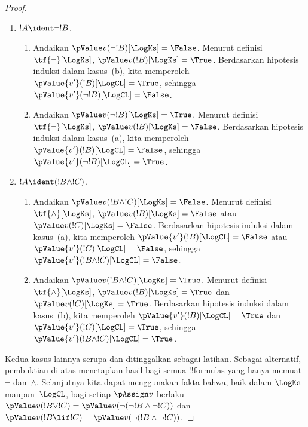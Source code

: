 \documentclass[../../../include/open-logic-section]{subfiles}
\begin{document}
\begin{proof}
\begin{enumerate}
    Untuk langkah induksi, bahas kasus-kasus berikut:
    \item $!A\ident\lnot !B$.
    \begin{enumerate}
      \item Andaikan $\pValue v(\lnot!B)[\LogKs]=\False$. Menurut definisi
      $\tf{\lnot}[\LogKs]$, $\pValue v(!B)[\LogKs]=\True$. Berdasarkan
      hipotesis induksi dalam kasus~(b), kita memperoleh
      $\pValue{v'}(!B)[\LogCL]=\True$, sehingga
      $\pValue{v'}(\lnot !B)[\LogCL]=\False$.
      \item Andaikan $\pValue v(\lnot!B)[\LogKs]=\True$. Menurut definisi
      $\tf{\lnot}[\LogKs]$, $\pValue v(!B)[\LogKs]=\False$. Berdasarkan
      hipotesis induksi dalam kasus~(a), kita memperoleh
      $\pValue{v'}(!B)[\LogCL]=\False$, sehingga
      $\pValue{v'}(\lnot !B)[\LogCL]=\True$.
    \end{enumerate}

    \item $!A\ident(!B\land !C)$.
    \begin{enumerate}
      \item Andaikan $\pValue v(!B\land !C)[\LogKs]=\False$. Menurut
      definisi $\tf{\land}[\LogKs]$, $\pValue v(!B)[\LogKs]=\False$ atau
      $\pValue v(!C)[\LogKs]=\False$. Berdasarkan hipotesis induksi dalam
      kasus~(a), kita memperoleh $\pValue{v'}(!B)[\LogCL]=\False$ atau
      $\pValue{v'}(!C)[\LogCL]=\False$, sehingga
      $\pValue{v'}(!B\land !C)[\LogCL]=\False$.
      \item Andaikan $\pValue v(!B\land !C)[\LogKs]=\True$. Menurut definisi
      $\tf{\land}[\LogKs]$, $\pValue v(!B)[\LogKs]=\True$ dan
      $\pValue v(!C)[\LogKs]=\True$. Berdasarkan hipotesis induksi dalam
      kasus~(b), kita memperoleh $\pValue{v'}(!B)[\LogCL]=\True$ dan
      $\pValue{v'}(!C)[\LogCL]=\True$, sehingga
      $\pValue{v'}(!B\land !C)[\LogCL]=\True$.
    \end{enumerate}
  \end{enumerate}

  Kedua kasus lainnya serupa dan ditinggalkan sebagai latihan. Sebagai
  alternatif, pembuktian di atas menetapkan hasil bagi semua !!{formula}s yang
  hanya memuat $\lnot$ dan~$\land$. Selanjutnya kita dapat menggunakan fakta
  bahwa, baik dalam $\LogKs$ maupun~$\LogCL$, bagi setiap $\pAssign v$ berlaku
  $\pValue v(!B\lor !C)=\pValue v(\lnot(\lnot!B\land\lnot !C))$ dan
  $\pValue v(!B\lif !C)=\pValue v(\lnot(!B\land\lnot !C))$.
\end{proof}
\end{document}
